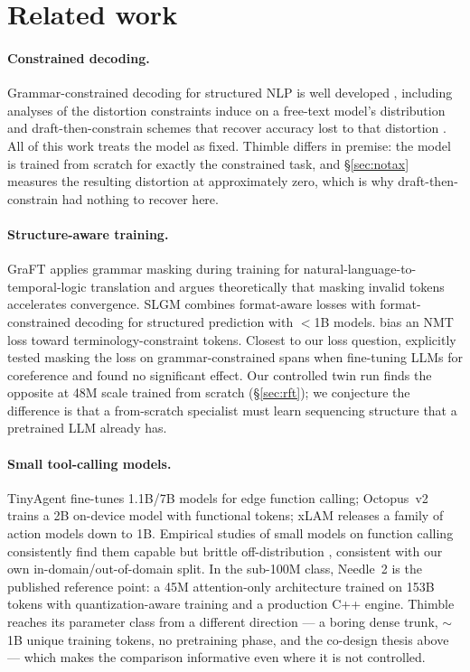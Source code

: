 \documentclass[10pt]{article}
\newcommand{\thimble}{Thimble}
\newcommand{\needle}{Needle~2}
\begin{document}
\section{Related work}
\label{sec:related}

\paragraph{Constrained decoding.} Grammar-constrained decoding for structured
NLP is well developed \citep{gcd2023,domino,xgrammar}, including analyses of
the distortion constraints induce on a free-text model's distribution
\citep{gad} and draft-then-constrain schemes that recover accuracy lost to
that distortion \citep{dccd}. All of this work treats the model as fixed.
\thimble{} differs in premise: the model is trained from scratch for exactly
the constrained task, and \S\ref{sec:notax} measures the resulting distortion
at approximately zero, which is why draft-then-constrain had nothing to
recover here.

\paragraph{Structure-aware training.} GraFT \citep{graft} applies grammar
masking during training for natural-language-to-temporal-logic translation and
argues theoretically that masking invalid tokens accelerates convergence. SLGM
\citep{slgm} combines format-aware losses with format-constrained decoding for
structured prediction with $<$1B models. \citet{ailem2021} bias an NMT loss
toward terminology-constraint tokens. Closest to our loss question,
\citet{gan2025} explicitly tested masking the loss on grammar-constrained
spans when fine-tuning LLMs for coreference and found no significant effect.
Our controlled twin run finds the opposite at 48M scale trained from scratch
(\S\ref{sec:rft}); we conjecture the difference is that a from-scratch
specialist must learn sequencing structure that a pretrained LLM already has.

\paragraph{Small tool-calling models.} TinyAgent \citep{tinyagent} fine-tunes
1.1B/7B models for edge function calling; Octopus~v2 \citep{octopusv2} trains
a 2B on-device model with functional tokens; xLAM \citep{xlam} releases a
family of action models down to 1B. Empirical studies of small models on
function calling consistently find them capable but brittle off-distribution
\citep{smallbig}, consistent with our own in-domain/out-of-domain split. In
the sub-100M class, \needle{} \citep{needle2,san} is the published reference
point: a 45M attention-only architecture trained on 153B tokens with
quantization-aware training and a production C++ engine. \thimble{} reaches its parameter class from a different
direction --- a boring dense trunk, $\sim$1B unique training tokens, no
pretraining phase, and the co-design thesis above --- which makes the
comparison informative even where it is not controlled.
\end{document}
